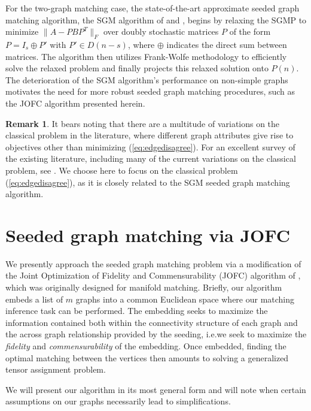 \documentclass[12pt]{article}
\numberwithin{equation}{section}
\theoremstyle{definition}
\newtheorem{remark}[theorem]{Remark}
\newcommand{\begr}{\begin{remark}}
\newcommand{\enr}{\end{remark}}
\begin{document}
For the two-graph matching case, the state-of-the-art approximate seeded
graph matching algorithm, the SGM algorithm of \cite{FAP} and
\cite{sgm2}, begins by relaxing the SGMP to minimize $\|A-PBP^T\|_F$
over doubly stochastic matrices $P$ of the form $P=I_s\oplus P'$ with
$P'\in D(n-s)$, where $\oplus$ indicates the direct sum between
matrices.
The algorithm then utilizes Frank-Wolfe methodology to efficiently solve the relaxed problem and finally projects this relaxed solution onto $P(n)$.  The deterioration of the SGM algorithm's performance on non-simple graphs motivates the need for more robust seeded graph matching procedures, such as the JOFC algorithm presented herein.

\begr
It bears noting that there are a multitude of variations on the classical problem in the literature, where different graph attributes give rise to objectives other than minimizing (\ref{eq:edgedisagree}).
For an excellent survey of the existing literature, including many of the current variations on the classical problem, see \cite{30ygm}.  We choose here to focus on the classical problem (\ref{eq:edgedisagree}), as it is closely related to the SGM seeded graph matching algorithm.
\enr

\section{Seeded graph matching via JOFC}
\label{S:JOFC}

We presently approach the seeded graph matching problem via a modification of the Joint Optimization of Fidelity and Commensurability (JOFC) algorithm of \cite{JOFC}, which was originally designed for manifold matching.
Briefly, our algorithm embeds a list of $m$ graphs into a common Euclidean space where our matching inference task can be performed.
The embedding seeks to maximize the information contained both within the connectivity structure of each graph and the across graph relationship provided by the seeding, i.e.\@ we seek to maximize the {\it fidelity} and {\it commensurability} of the embedding.
Once embedded, finding the optimal matching between the vertices then amounts to solving a generalized tensor assignment problem.


We will present our algorithm in its most general form and will note when certain assumptions on our graphs necessarily lead to simplifications.
\end{document}
